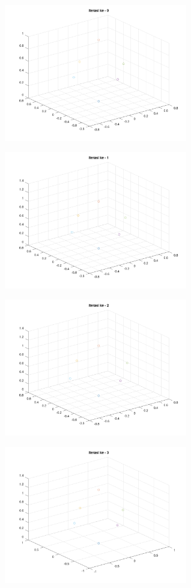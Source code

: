 \documentclass[11pt]{article}
\begin{document}
\begin{multicols}{2}
    \includegraphics[width=8cm]{img/Iterasi00.png}
    
    \includegraphics[width=8cm]{img/Iterasi01.png}

    \includegraphics[width=8cm]{img/Iterasi02.png}

    \includegraphics[width=8cm]{img/Iterasi03.png}


\end{multicols}
\end{document}
